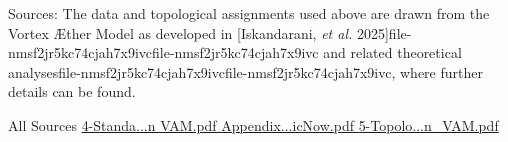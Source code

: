 Sources: The data and topological assignments used above are drawn from the Vortex Æther Model as developed in [Iskandarani, \textit{et al.} 2025]file-nmsf2jr5kc74cjah7x9ivcfile-nmsf2jr5kc74cjah7x9ivc and related theoretical analysesfile-nmsf2jr5kc74cjah7x9ivcfile-nmsf2jr5kc74cjah7x9ivc, where further details can be found.



All Sources
\href{https://chatgpt.com/g/g-p-684f42a62f1c8191b3f95def3f9add8e-vam-v0-2/c/4-StandardModel-Lagrangian%20VAM.pdf}{4-Standa...n VAM.pdf
}\href{https://chatgpt.com/g/g-p-684f42a62f1c8191b3f95def3f9add8e-vam-v0-2/c/Appendix_%C3%86thericNow.pdf}{Appendix...icNow.pdf
}\href{https://chatgpt.com/g/g-p-684f42a62f1c8191b3f95def3f9add8e-vam-v0-2/c/5-Topological_Fluid_Dynamic_Lagrangian_In_VAM.pdf}{5-Topolo...n_VAM.pdf
}



